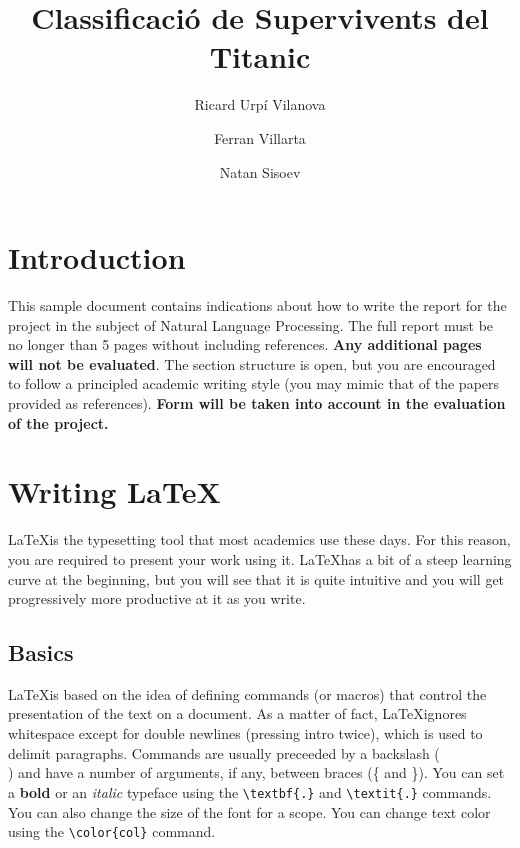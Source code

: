 \documentclass[9pt,a4paper,twoside]{tau-class/tau}
\title{Classificació de Supervivents del Titanic}
\author[a,1]{Ricard Urpí Vilanova}
\author[b,2]{Ferran Villarta}
\author[c,3]{Natan Sisoev}
\affil[a]{1711326}
\affil[b]{1704051}
\affil[c]{1706198}
\begin{document}
    \maketitle 
    \thispagestyle{firststyle} \tauabstract 
    \tableofcontents
    \linenumbers 
    

\section{Introduction}

    This sample document contains indications about how to write the report for the project in the subject of Natural Language Processing. The full report must be no longer than 5 pages without including references. \textbf{Any additional pages will not be evaluated}. The section structure is open, but you are encouraged to follow a principled academic writing style (you may mimic that of the papers provided as references). \textbf{Form will be taken into account in the evaluation of the project.}

\section{Writing \LaTeX}

	\LaTeX is the typesetting tool that most academics use these days. For this reason, you are required to present your work using it. \LaTeX has a bit of a steep learning curve at the beginning, but you will see that it is quite intuitive and you will get progressively more productive at it as you write.

    \subsection{Basics}

    \LaTeX is based on the idea of defining commands (or macros) that control the presentation of the text on a document. As a matter of fact, \LaTeX ignores whitespace except for double newlines (pressing intro twice), which is used to delimit paragraphs. Commands are usually preceeded by a backslash (\\) and have a number of arguments, if any, between braces (\{ and \}). You can set a \textbf{bold} or an \textit{italic} typeface using the \verb|\textbf{.}| and \verb|\textit{.}| commands. You can also {\tiny change the size of the font for a scope}. You can change {\color{red} text color} using the \verb|\color{col}| command. 
\end{document}
